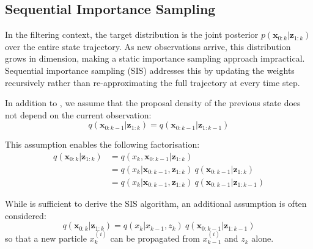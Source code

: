 \subsection{Sequential Importance Sampling}

In the filtering context, the target distribution is the joint posterior $p(\mathbf{x}_{0:k}|\mathbf{z}_{1:k})$ over the entire state trajectory. As new observations arrive, this distribution grows in dimension, making a static importance sampling approach impractical. Sequential importance sampling (SIS) addresses this by updating the weights recursively rather than re-approximating the full trajectory at every time step.

\begin{assumption}\label{th:SIS_hypotheses}
	In addition to , we assume that the proposal density of the previous state does not depend on the current observation:
	\begin{equation}
		q(\mathbf{x}_{0:k-1}|\mathbf{z}_{1:k})=q(\mathbf{x}_{0:k-1}|\mathbf{z}_{1:k-1})
	\end{equation}
\end{assumption}

This assumption enables the following factorisation:
\begin{equation}
	\begin{aligned}
	q(\mathbf{x}_{0:k}|\mathbf{z}_{1:k})&=q(x_k,\mathbf{x}_{0:k-1}|\mathbf{z}_{1:k})\\
	&=q(x_k|\mathbf{x}_{0:k-1},\mathbf{z}_{1:k})\:q(\mathbf{x}_{0:k-1}|\mathbf{z}_{1:k})\\
	&=q(x_k|\mathbf{x}_{0:k-1},\mathbf{z}_{1:k})\:q(\mathbf{x}_{0:k-1}|\mathbf{z}_{1:k-1})
	\end{aligned}
\end{equation}

While  is sufficient to derive the SIS algorithm, an additional assumption is often considered:
\begin{equation}
	q(\mathbf{x}_{0:k}|\mathbf{z}_{1:k})=q(x_k|x_{k-1},z_k)\:q(\mathbf{x}_{0:k-1}|\mathbf{z}_{1:k-1})\label{eq:simplification_q}
\end{equation}
so that a new particle $x_k^{(i)}$ can be propagated from $x_{k-1}^{(i)}$ and $z_k$ alone.

